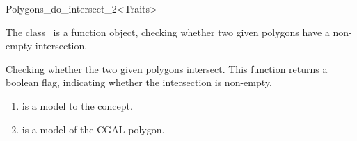 
\ccRefPageBegin



\begin{ccRefFunctionObjectClass}{Polygons_do_intersect_2<Traits>}
\label{OVL_sec:polygon_do_intersect}
    
\ccDefinition
The class \ccClassTemplateName\ is a function object,
checking whether two given polygons have a non-empty 
intersection.



{Checking whether the two given polygons intersect.
This function returns a boolean flag, 
indicating whether the intersection is non-empty.
}

\begin{enumerate}
   \item
    is a model to the  concept.
   \item
    is a model of the CGAL polygon.
\end{enumerate}

\ccSeeAlso

 \\
 \\
 \\
 \\




\end{ccRefFunctionObjectClass}

\ccRefPageEnd






